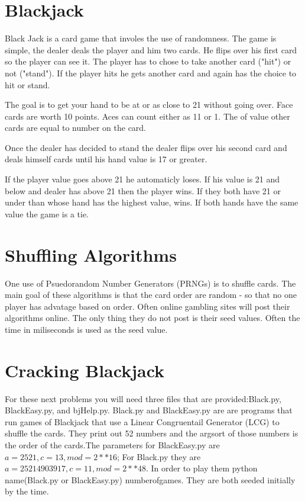 \label{Ch:BJ}


\section*{Blackjack}


Black Jack is a card game that involes the use of randomness. The game is simple, the dealer deals the player and him two cards. He flips over his first card so the player can see it. The player has to chose to take another card ("hit") or not ("stand"). If the player hits he gets another card and again has the choice to hit or stand.

The goal is to get your hand to be at or as close to 21 without going over. Face cards are worth 10 points. Aces can count either as 11 or 1. The of value other cards are equal to number on the card.

Once the dealer has decided to stand the dealer flips over his second card and deals himself cards until his hand value is 17 or greater. 

If the player value goes above 21 he automaticly loses. If his value is 21 and below and dealer has above 21 then the player wins. If they both have 21 or under than whose hand has the highest value, wins. If both hands have the same value the game is a tie.

\section*{Shuffling Algorithms}

One use of Psuedorandom Number Generators (PRNGs) is to shuffle cards. The main goal of these algorithms is that the card order are random - so that no one player has advatage based on order. Often online gambling sites will post their algorithms online. The only thing they do not post is their seed values. Often the time in miliseconds is used as the seed value.

\section*{Cracking Blackjack}
For these next problems you will need three files that are provided:Black.py, BlackEasy.py, and bjHelp.py.  Black.py and BlackEasy.py are are programs that run games of Blackjack that use a Linear Congruentail Generator (LCG) to shuffle the cards. They print out 52 numbers and the argsort of those numbers is the order of the cards.The parameters for BlackEasy.py are $a=2521,c=13,mod=2**16$; For Black.py they are $a=25214903917,c=11,mod=2**48$. In order to play them python name(Black.py or BlackEasy.py) numberofgames. They are both seeded initially by the time.

